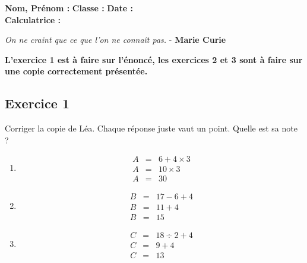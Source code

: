 \documentclass[12pt]{article}
\begin{document}

\textbf{Nom, Prénom :} \hspace{8cm} \textbf{Classe :} \hspace{3cm} \textbf{Date :}\\
\textbf{Calculatrice :}

\begin{center}
  \textit{On ne craint que ce que l'on ne connaît pas.}  - \textbf{Marie Curie}
\end{center}


\textbf{L'exercice 1 est à faire sur l'énoncé, les exercices 2 et 3 sont à faire sur une copie correctement présentée.}

\subsection*{Exercice 1} 

Corriger la copie de Léa. Chaque réponse juste vaut un point. Quelle est sa note ?

\begin{multicols}{3}

  \begin{enumerate}
  \item \begin{eqnarray*}
    A &=& 6 + 4 \times 3 \\
    A &=& 10 \times 3 \\
    A &=& 30 
  \end{eqnarray*}

  \item \begin{eqnarray*}
    B &=& 17 - 6 + 4  \\
    B &=& 11 + 4      \\
    B &=& 15
  \end{eqnarray*}

  \item \begin{eqnarray*}
    C &=& 18 \div 2 + 4 \\
    C &=& 9 + 4         \\
    C &=& 13
  \end{eqnarray*}
  \end{enumerate}
  
\end{multicols}
\end{document}
